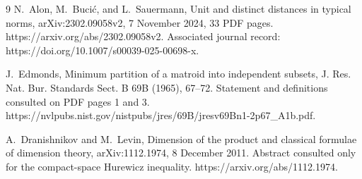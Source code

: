 \documentclass[10pt]{article}
\begin{document}
9 N. Alon, M. Bucić, and L. Sauermann, Unit and distinct distances in typical norms, arXiv:2302.09058v2, 7 November 2024, 33 PDF pages. https://arxiv.org/abs/2302.09058v2. Associated journal record: https://doi.org/10.1007/s00039-025-00698-x.\par
J. Edmonds, Minimum partition of a matroid into independent subsets, J. Res. Nat. Bur. Standards Sect. B 69B (1965), 67–72. Statement and definitions consulted on PDF pages 1 and 3. https://nvlpubs.nist.gov/nistpubs/jres/69B/jresv69Bn1-2p67\_A1b.pdf.\par
A. Dranishnikov and M. Levin, Dimension of the product and classical formulae of dimension theory, arXiv:1112.1974, 8 December 2011. Abstract consulted only for the compact-space Hurewicz inequality. https://arxiv.org/abs/1112.1974.\par
\end{document}
